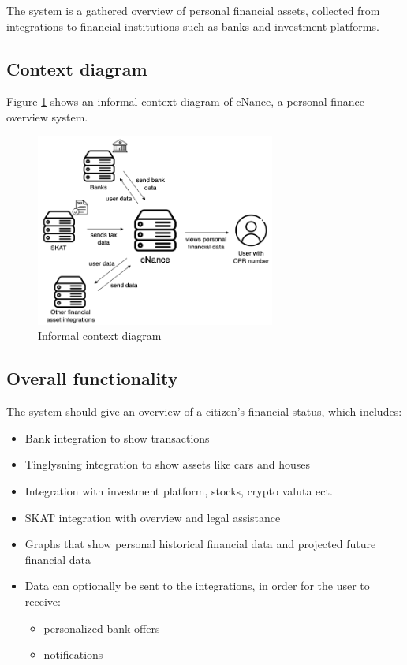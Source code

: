 \documentclass[10pt]{article}
\begin{document}
The system is a gathered overview of personal financial assets, collected from integrations to financial institutions such as banks and investment platforms. 

\subsection{Context diagram}
Figure \ref{fig:context_diagram} shows an informal context diagram of cNance, a personal finance overview system. 

\begin{figure}
  \centering
  \includegraphics[width=0.7\textwidth]{figures/context-diagram2.png}
  \caption{Informal context diagram}
  \label{fig:context_diagram}
\end{figure}


\subsection{Overall functionality}

The system should give an overview of a citizen's financial status, which includes:
    \begin{itemize}
        \item Bank integration to show transactions
        \item Tinglysning integration to show assets like cars and houses
        \item Integration with investment platform, stocks, crypto valuta ect.
        \item SKAT integration with overview and legal assistance
        \item Graphs that show personal historical financial data and projected future financial data
        \item Data can optionally be sent to the integrations, in order for the user to receive:
        \begin{itemize}
            \item personalized bank offers
            \item notifications
        \end{itemize} 
    \end{itemize}
 
\end{document}
